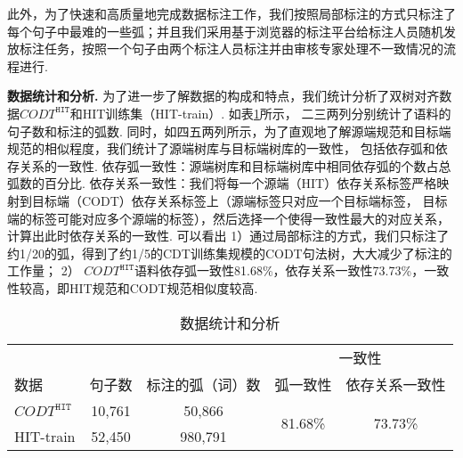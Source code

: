 此外，为了快速和高质量地完成数据标注工作，我们按照局部标注的方式只标注了每个句子中最难的一些弧；并且我们采用基于浏览器的标注平台给标注人员随机发放标注任务，按照一个句子由两个标注人员标注并由审核专家处理不一致情况的流程进行. %

\textbf{数据统计和分析.  } 为了进一步了解数据的构成和特点，我们统计分析了双树对齐数据$CODT^{\texttt{HIT}}$和HIT训练集（HIT-train）. 如表\ref{tb:HIT-data-stat}所示，
二三两列分别统计了语料的句子数和标注的弧数. 同时，如四五两列所示，为了直观地了解源端规范和目标端规范的相似程度，我们统计了源端树库与目标端树库的一致性，
包括依存弧和依存关系的一致性. 依存弧一致性：源端树库和目标端树库中相同依存弧的个数占总弧数的百分比.
依存关系一致性：我们将每一个源端（HIT）依存关系标签严格映射到目标端（CODT）依存关系标签上（源端标签只对应一个目标端标签，
目标端的标签可能对应多个源端的标签），然后选择一个使得一致性最大的对应关系，计算出此时依存关系的一致性. 可以看出 1）通过局部标注的方式，我们只标注了约1/20的弧，得到了约1/5的CDT训练集规模的CODT句法树，大大减少了标注的工作量；
2） $CODT^{\texttt{HIT}}$语料依存弧一致性81.68\%，依存关系一致性73.73\%，一致性较高，即HIT规范和CODT规范相似度较高.
\begin{table}[hb]
    \centering
    \caption{数据统计和分析}
    \label{tb:HIT-data-stat}
    \begin{tabular}{l cc cc}
        \toprule
                              &        &                  & \multicolumn{2}{c}{ 一致性}                  \\
        \cmidrule(lr){4-5}
        数据                  & 句子数 & 标注的弧（词）数 & 弧一致性                    & 依存关系一致性 \\
        \midrule
        $CODT^{\texttt{HIT}}$ & 10,761 & 50,866           & \multirow{2}{1cm}{81.68\%}  &
        \multirow{2}{1cm}{73.73\%}                                                                       \\
        HIT-train             & 52,450 & 980,791          &                             &                \\
        \bottomrule
    \end{tabular}
\end{table}

